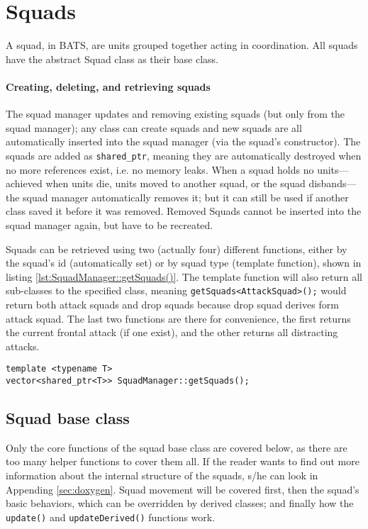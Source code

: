 \section{Squads}
A squad, in BATS, are units grouped together acting in coordination. All squads have the abstract Squad class as their base class. 

\paragraph{Creating, deleting, and retrieving squads}
The squad manager updates and removing existing squads (but only from the squad manager); any class can create squads and new squads are all automatically inserted into the squad manager (via the squad's constructor). The squads are added as \texttt{shared\_ptr}, meaning they are automatically destroyed when no more references exist, i.e. no memory leaks. When a squad holds no units—achieved when units die, units moved to another squad, or the squad disbands—the squad manager automatically removes it; but it can still be used if another class saved it before it was removed. Removed Squads cannot be inserted into the squad manager again, but have to be recreated.

Squads can be retrieved using two (actually four) different functions, either by the squad's id (automatically set) or by squad type (template function), shown in listing \ref{lst:SquadManager::getSquads()}. The template function will also return all sub-classes to the specified class, meaning \texttt{getSquads<AttackSquad>();} would return both attack squads and drop squads because drop squad derives form attack squad. The last two functions are there for convenience, the first returns the current frontal attack (if one exist), and the other returns all distracting attacks.
\begin{lstlisting}[caption={Template function to retrieve squads of the specified type.},label={lst:SquadManager::getSquads()}]
template <typename T>
vector<shared_ptr<T>> SquadManager::getSquads();
\end{lstlisting}

\subsection{Squad base class}
Only the core functions of the squad base class are covered below, as there are too many helper functions to cover them all. If the reader wants to find out more information about the internal structure of the squads, s/he can look in Appending \ref{sec:doxygen}. Squad movement will be covered first, then the squad's basic behaviors, which can be overridden by derived classes; and finally how the \texttt{update()} and \texttt{updateDerived()} functions work.

